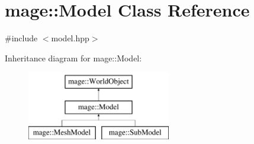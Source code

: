 \hypertarget{classmage_1_1_model}{}\section{mage\+:\+:Model Class Reference}
\label{classmage_1_1_model}


{\ttfamily \#include $<$model.\+hpp$>$}

Inheritance diagram for mage\+:\+:Model\+:\begin{figure}[H]
\begin{center}
\leavevmode
\includegraphics[height=3.000000cm]{classmage_1_1_model}
\end{center}
\end{figure}
